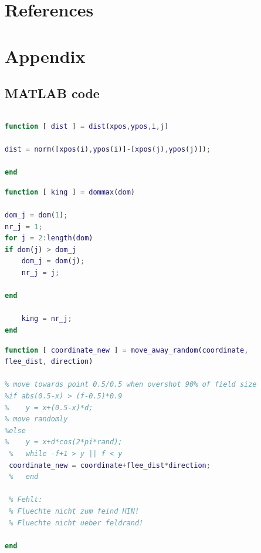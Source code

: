 \documentclass[11pt]{article}
\begin{document}
\pagebreak
\section{References}


\nocite{Dunbar1979}
\nocite{Dunbar1983}
\nocite{Dunbar1984}
\nocite{Dunbar1986}
\nocite{Crook1966}
\nocite{Kawai1983}
\nocite{Ohsawa1984}
\nocite{Gruter2004}

\section{Appendix}
\subsection{MATLAB code}
\begin{lstlisting}[language=Matlab, backgroundcolor=\color{blue!10}, frame=single, framerule=0.1pt,commentstyle=\color{blue}, caption=main: SIMonkey\_live.m]

\end{lstlisting}

\begin{lstlisting}[language=Matlab, backgroundcolor=\color{blue!10}, frame=single, framerule=0.1pt,commentstyle=\color{blue}, caption=function: dist.m]
function [ dist ] = dist(xpos,ypos,i,j)

dist = norm([xpos(i),ypos(i)]-[xpos(j),ypos(j)]);

end
\end{lstlisting}

\begin{lstlisting}[language=Matlab, backgroundcolor=\color{blue!10}, frame=single, framerule=0.1pt,commentstyle=\color{blue}, caption=function: dommax.m]
function [ king ] = dommax(dom)

dom_j = dom(1);
nr_j = 1;
for j = 2:length(dom)
if dom(j) > dom_j
    dom_j = dom(j);
    nr_j = j;
    
end   
    
    king = nr_j;
end
\end{lstlisting}

\begin{lstlisting}[language=Matlab, backgroundcolor=\color{blue!10}, frame=single, framerule=0.1pt, commentstyle=\color{blue}, caption=function: move\_away\_random.m]
function [ coordinate_new ] = move_away_random(coordinate, 
flee_dist, direction)

% move towards point 0.5/0.5 when overshot 90% of field size
%if abs(0.5-x) > (f-0.5)*0.9
%    y = x+(0.5-x)*d;
% move randomly
%else
%    y = x+d*cos(2*pi*rand);
 %   while -f+1 > y || f < y
 coordinate_new = coordinate+flee_dist*direction;
 %   end
 
 % Fehlt:
 % Fluechte nicht zum feind HIN!
 % Fluechte nicht ueber feldrand!

end
\end{lstlisting}
\end{document}
